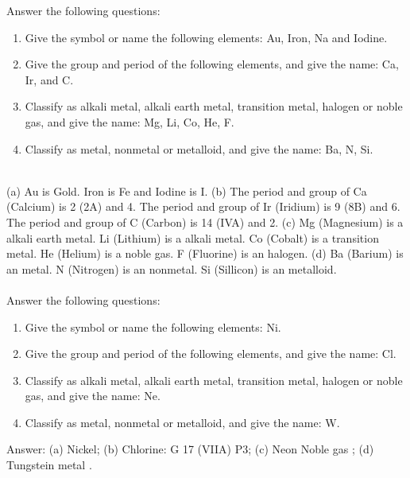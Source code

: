 \documentclass[main.tex]{subfiles}
\begin{document}
\begin{example} %
Answer the following questions:
\begin{enumerate}[label=(\alph*)]
\item Give the symbol or name the following elements: Au, Iron, Na and Iodine.
\item Give the group and period of the following elements, and give the name: Ca, Ir, and C.
\item Classify as alkali metal, alkali earth metal, transition metal, halogen or noble gas, and give the name: Mg, Li, Co, He, F.
\item Classify as metal, nonmetal or metalloid, and give the name: Ba, N, Si.
\end{enumerate}
\\
(a) Au is Gold. Iron is Fe and Iodine is I. (b) The period and group of Ca (Calcium) is 2 (2A) and 4. The period and group of Ir (Iridium) is 9 (8B) and 6. The period and group of C (Carbon) is 14 (IVA) and 2. (c) Mg (Magnesium) is a alkali earth metal. Li (Lithium) is a alkali  metal. Co (Cobalt) is a transition metal. He (Helium) is a noble gas. F (Fluorine) is an halogen. (d) Ba (Barium) is an metal. N (Nitrogen) is an nonmetal. Si (Sillicon) is an metalloid.\\
\faDiamond\ \\
Answer the following questions:
\begin{enumerate}[label=(\alph*)]
\item Give the symbol or name the following elements: Ni.
\item Give the group and period of the following elements, and give the name: Cl.
\item Classify as alkali metal, alkali earth metal, transition metal, halogen or noble gas, and give the name: Ne.
\item Classify as metal, nonmetal or metalloid, and give the name: W.
\end{enumerate}
\flushright Answer: (a) Nickel; (b) Chlorine: G 17 (VIIA)  P3; (c) Neon Noble gas ; (d) Tungstein metal .
\end{example}%
\end{document}
